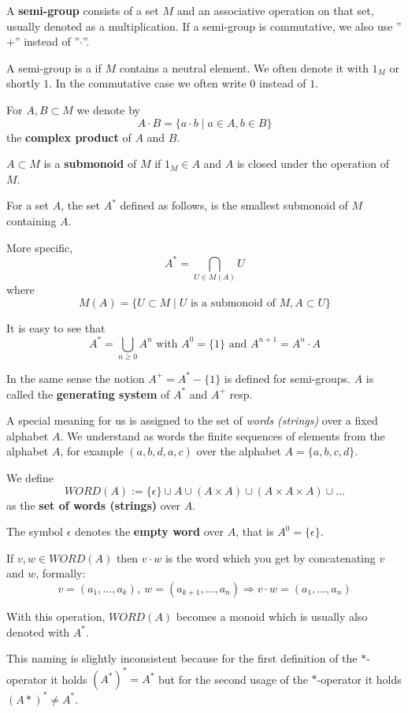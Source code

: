 A {\bf semi-group} consists of a set $M$ and an associative operation on that
set, usually denoted as a multiplication. If a semi-group is commutative, we
also use ''$+$'' instead of ''$\cdot$''.

A semi-group is a  if $M$ contains a neutral element. We
often denote it with $1_M$ or shortly $1$. In the commutative case we often write $0$
instead of $1$.

For $A,B \subset M$ we denote by 
\[ A \cdot B = \{ a \cdot b \mid a \in A, b \in B \}\]
the {\bf complex product} of $A$ and $B$.

$A \subset M$ is a {\bf submonoid} of $M$ if $1_M \in A$ and $A$ is closed under
the operation of $M$.

For a set $A$, the set $A^*$ defined as follows, is the smallest submonoid of
$M$ containing $A$. 

More specific,
\[ A^* = \bigcap_{U \in M(A)} U	\]
where 
\[ M(A) = \{ U \subset M \mid U \mbox{ is a submonoid of } M, A \subset U \} \]

It is easy to see that 
\[ A^* = \bigcup_{n \geq 0} A^n \mbox{ with }A^0 = \{ 1 \}\mbox{ and }A^{n+1}
= A^n \cdot A \]

In the same sense the notion $A^+ = A^* - \{1\}$ is defined for semi-groups. $A$
is called the {\bf generating system} of $A^*$ and $A^+$ resp.

A special meaning for us is assigned to the set of {\em words (strings)} over a
fixed alphabet $A$. We understand as words the finite sequences of elements from
the alphabet $A$, for example $(a,b,d,a,c)$ over the alphabet $A = \{ a,b,c,d
\}$.

We define
\[ WORD(A) := \{\epsilon\} \cup A \cup (A \times A) \cup (A \times A \times A)
\cup \ldots \]
as the {\bf set of words (strings)} over $A$. 

The symbol $\epsilon$ denotes the {\bf empty word} over $A$, that is $A^0 =
\{\epsilon\}$.

If $v, w \in WORD(A)$ then $v \cdot w$ is the word which you get by
concatenating $v$ and $w$, formally:
\[ v = (a_1,\ldots, a_k),\ w = (a_{k+1}, \ldots, a_n) \Rightarrow v \cdot
w = (a_1, \ldots, a_n) \]

With this operation, $WORD(A)$ becomes a monoid which is usually also denoted
with $A^*$.

This naming is slightly inconsistent because for the first definition of
the $*$-operator it holds $(A^*)^* = A^*$ but for the second usage of the
$*$-operator it holds $(A*)^* \neq A^*$.

